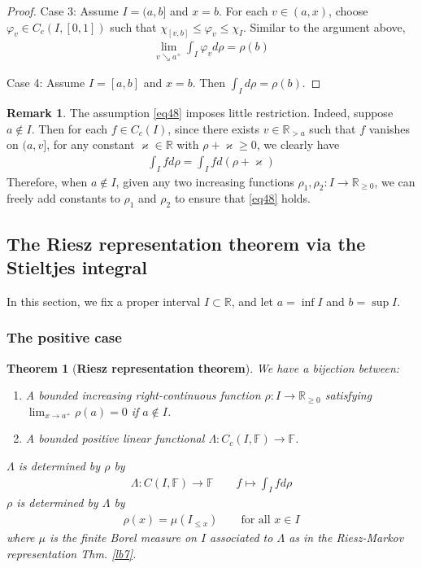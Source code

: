 \documentclass[12pt,b5paper,notitlepage]{article}
\theoremstyle{definition}
\newtheorem{rem}[df]{Remark}
\theoremstyle{plain}
\newtheorem{thm}[df]{Theorem}
\newcommand{\Rbb}{\mathbb R}
\newcommand{\Fbb}{\mathbb F}
\newcommand{\dps}{\displaystyle}
\numberwithin{equation}{section}
\begin{document}
\begin{proof}
Case 3: Assume $I=(a,b]$ and $x=b$.  For each $v\in(a,x)$, choose $\varphi_v\in C_c(I,[0,1])$ such that $\chi_{[v,b]}\leq \varphi_v\leq \chi_I$. Similar to the argument above,
\begin{align*}
\lim_{v\searrow a^+}\int_I\varphi_vd\rho=\rho(b)
\end{align*}

Case 4: Assume $I=[a,b]$ and $x=b$. Then $\dps\int_I d\rho=\rho(b)$.
\end{proof}


\begin{rem}\label{lb93}
The assumption \eqref{eq48} imposes little restriction. Indeed, suppose $a\notin I$. Then for each $f\in C_c(I)$, since there exists $v\in\Rbb_{>a}$ such that $f$ vanishes on $(a,v]$, for any constant $\varkappa\in\Rbb$ with $\rho+\varkappa\geq0$, we clearly have
\begin{align}
\int_I fd\rho=\int_I fd(\rho+\varkappa)
\end{align}
Therefore, when $a\notin I$, given any two increasing functions $\rho_1,\rho_2:I\rightarrow\Rbb_{\geq0}$, we can freely add constants to $\rho_1$ and $\rho_2$ to ensure that \eqref{eq48} holds.
\end{rem}







\subsection{The Riesz representation theorem via the Stieltjes integral}

In this section, we fix a proper interval $I\subset\Rbb$, and let $a=\inf I$ and $b=\sup I$.

\subsubsection{The positive case}




\begin{thm}[\textbf{Riesz representation theorem}]\label{lb9}
We have a bijection between:
\begin{enumerate}[label=(\alph*)]
\item A bounded increasing right-continuous function $\rho:I\rightarrow\Rbb_{\geq0}$ satisfying $\lim_{x\rightarrow a^+}\rho(a)=0$ if $a\notin I$.
\item A bounded positive linear functional $\Lambda:C_c(I,\Fbb)\rightarrow\Fbb$.
\end{enumerate}
$\Lambda$ is determined by $\rho$ by
\begin{align}\label{eq43}
\Lambda:C(I,\Fbb)\rightarrow\Fbb\qquad f\mapsto\int_I fd\rho
\end{align}
$\rho$ is determined by $\Lambda$ by 
\begin{align}\label{eq42}
\rho(x)=\mu(I_{\leq x})\qquad\text{for all }x\in I
\end{align}
where $\mu$ is the finite Borel measure on $I$ associated to $\Lambda$ as in the Riesz-Markov representation Thm. \ref{lb7}. 
\end{thm}
\end{document}
